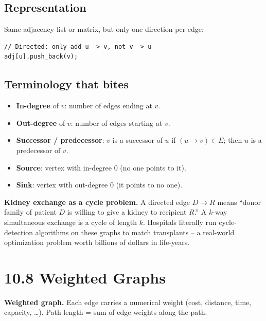 \documentclass[11pt]{article}
\begin{document}
\subsection*{Representation}

Same adjacency list or matrix, but only one direction per edge:

\begin{lstlisting}[basicstyle=\ttfamily\small,frame=single]
// Directed: only add u -> v, not v -> u
adj[u].push_back(v);
\end{lstlisting}

\subsection*{Terminology that bites}

\begin{itemize}[leftmargin=*]
    \item \textbf{In-degree} of $v$: number of edges ending at $v$.
    \item \textbf{Out-degree} of $v$: number of edges starting at $v$.
    \item \textbf{Successor / predecessor}: $v$ is a successor of $u$ if $(u \to v) \in E$; then $u$ is a predecessor of $v$.
    \item \textbf{Source}: vertex with in-degree 0 (no one points to it).
    \item \textbf{Sink}: vertex with out-degree 0 (it points to no one).
\end{itemize}

\begin{examplebox}
\textbf{Kidney exchange as a cycle problem.} A directed edge $D \to R$ means ``donor family of patient $D$ is willing to give a kidney to recipient $R$.'' A $k$-way simultaneous exchange is a cycle of length $k$. Hospitals literally run cycle-detection algorithms on these graphs to match transplants -- a real-world optimization problem worth billions of dollars in life-years.
\end{examplebox}

\section{10.8 Weighted Graphs}

\begin{defnbox}
\textbf{Weighted graph.} Each edge carries a numerical weight (cost, distance, time, capacity, \ldots). Path length = sum of edge weights along the path.
\end{defnbox}
\end{document}
